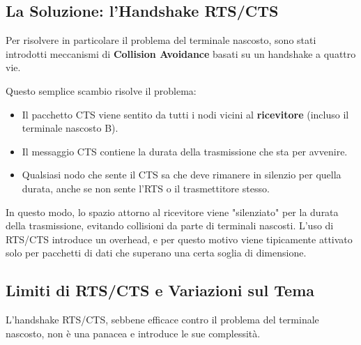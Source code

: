 

\subsection{La Soluzione: l'Handshake RTS/CTS}
Per risolvere in particolare il problema del terminale nascosto, sono stati introdotti meccanismi di \textbf{Collision Avoidance} basati su un handshake a quattro vie.


Questo semplice scambio risolve il problema:
\begin{itemize}
    \item Il pacchetto CTS viene sentito da tutti i nodi vicini al \textbf{ricevitore} (incluso il terminale nascosto B).
    \item Il messaggio CTS contiene la durata della trasmissione che sta per avvenire.
    \item Qualsiasi nodo che sente il CTS sa che deve rimanere in silenzio per quella durata, anche se non sente l'RTS o il trasmettitore stesso.
\end{itemize}

In questo modo, lo spazio attorno al ricevitore viene "silenziato" per la durata della trasmissione, evitando collisioni da parte di terminali nascosti. L'uso di RTS/CTS introduce un overhead, e per questo motivo viene tipicamente attivato solo per pacchetti di dati che superano una certa soglia di dimensione.
\subsection{Limiti di RTS/CTS e Variazioni sul Tema}
L'handshake RTS/CTS, sebbene efficace contro il problema del terminale nascosto, non è una panacea e introduce le sue complessità.


